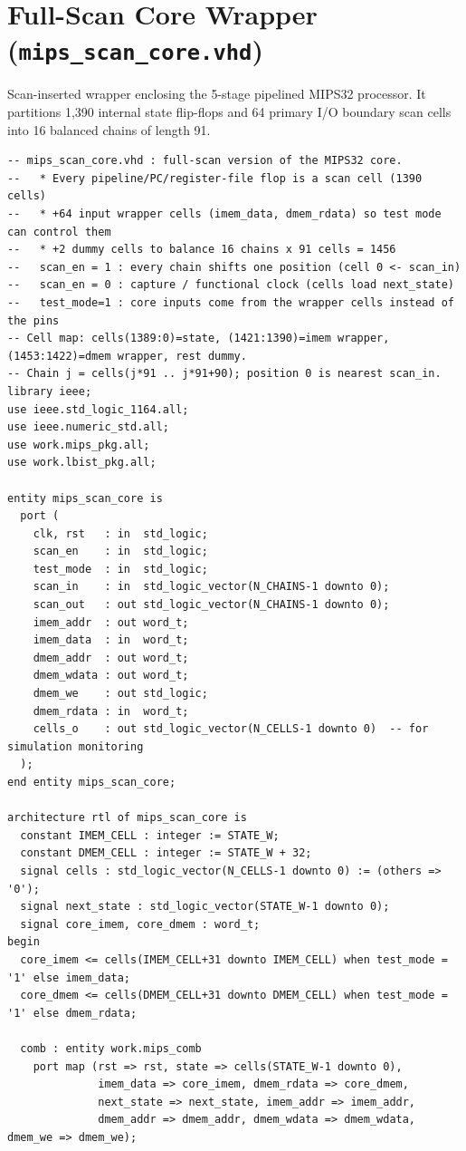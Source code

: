\documentclass[conference]{IEEEtran}
\begin{document}
\section{Full-Scan Core Wrapper (\texttt{mips\_scan\_core.vhd})}
\label{app:mips_scan_core}
Scan-inserted wrapper enclosing the 5-stage pipelined MIPS32 processor. It partitions 1,390 internal state flip-flops and 64 primary I/O boundary scan cells into 16 balanced chains of length 91.

\begin{lstlisting}[style=vhdlstyle, caption={Scan-Inserted MIPS32 Core (\texttt{mips\_scan\_core.vhd})}]
-- mips_scan_core.vhd : full-scan version of the MIPS32 core.
--   * Every pipeline/PC/register-file flop is a scan cell (1390 cells)
--   * +64 input wrapper cells (imem_data, dmem_rdata) so test mode can control them
--   * +2 dummy cells to balance 16 chains x 91 cells = 1456
--   scan_en = 1 : every chain shifts one position (cell 0 <- scan_in)
--   scan_en = 0 : capture / functional clock (cells load next_state)
--   test_mode=1 : core inputs come from the wrapper cells instead of the pins
-- Cell map: cells(1389:0)=state, (1421:1390)=imem wrapper, (1453:1422)=dmem wrapper, rest dummy.
-- Chain j = cells(j*91 .. j*91+90); position 0 is nearest scan_in.
library ieee;
use ieee.std_logic_1164.all;
use ieee.numeric_std.all;
use work.mips_pkg.all;
use work.lbist_pkg.all;

entity mips_scan_core is
  port (
    clk, rst   : in  std_logic;
    scan_en    : in  std_logic;
    test_mode  : in  std_logic;
    scan_in    : in  std_logic_vector(N_CHAINS-1 downto 0);
    scan_out   : out std_logic_vector(N_CHAINS-1 downto 0);
    imem_addr  : out word_t;
    imem_data  : in  word_t;
    dmem_addr  : out word_t;
    dmem_wdata : out word_t;
    dmem_we    : out std_logic;
    dmem_rdata : in  word_t;
    cells_o    : out std_logic_vector(N_CELLS-1 downto 0)  -- for simulation monitoring
  );
end entity mips_scan_core;

architecture rtl of mips_scan_core is
  constant IMEM_CELL : integer := STATE_W;
  constant DMEM_CELL : integer := STATE_W + 32;
  signal cells : std_logic_vector(N_CELLS-1 downto 0) := (others => '0');
  signal next_state : std_logic_vector(STATE_W-1 downto 0);
  signal core_imem, core_dmem : word_t;
begin
  core_imem <= cells(IMEM_CELL+31 downto IMEM_CELL) when test_mode = '1' else imem_data;
  core_dmem <= cells(DMEM_CELL+31 downto DMEM_CELL) when test_mode = '1' else dmem_rdata;

  comb : entity work.mips_comb
    port map (rst => rst, state => cells(STATE_W-1 downto 0),
              imem_data => core_imem, dmem_rdata => core_dmem,
              next_state => next_state, imem_addr => imem_addr,
              dmem_addr => dmem_addr, dmem_wdata => dmem_wdata, dmem_we => dmem_we);


\end{lstlisting}
\end{document}

